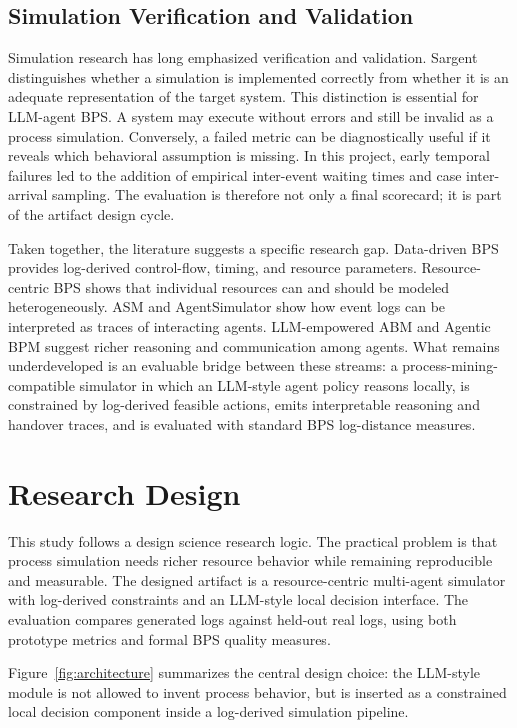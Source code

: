 \subsection{Simulation Verification and
Validation}\label{simulation-verification-and-validation}

Simulation research has long emphasized verification and validation.
Sargent~\cite{sargent2013vv} distinguishes whether a simulation is implemented
correctly from whether it is an adequate representation of the target
system. This distinction is essential for LLM-agent BPS. A system may
execute without errors and still be invalid as a process simulation.
Conversely, a failed metric can be diagnostically useful if it reveals
which behavioral assumption is missing. In this project, early temporal
failures led to the addition of empirical inter-event waiting times and
case inter-arrival sampling. The evaluation is therefore not only a
final scorecard; it is part of the artifact design cycle.

Taken together, the literature suggests a specific research gap.
Data-driven BPS provides log-derived control-flow, timing, and resource
parameters. Resource-centric BPS shows that individual resources can and
should be modeled heterogeneously. ASM and AgentSimulator show how event
logs can be interpreted as traces of interacting agents. LLM-empowered
ABM and Agentic BPM suggest richer reasoning and communication among
agents. What remains underdeveloped is an evaluable bridge between these
streams: a process-mining-compatible simulator in which an LLM-style
agent policy reasons locally, is constrained by log-derived feasible
actions, emits interpretable reasoning and handover traces, and is
evaluated with standard BPS log-distance measures.

\section{Research Design}\label{research-design}

This study follows a design science research logic. The practical
problem is that process simulation needs richer resource behavior while
remaining reproducible and measurable. The designed artifact is a
resource-centric multi-agent simulator with log-derived constraints and
an LLM-style local decision interface. The evaluation compares generated
logs against held-out real logs, using both prototype metrics and formal
BPS quality measures.

Figure~\ref{fig:architecture} summarizes the central design choice: the LLM-style module is
not allowed to invent process behavior, but is inserted as a constrained
local decision component inside a log-derived simulation pipeline.

